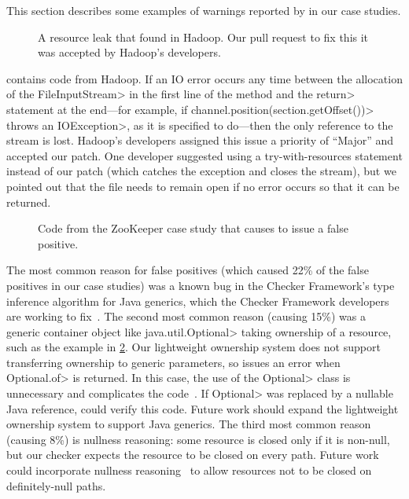 This section describes some examples of warnings reported by \tool
in our case studies.

\begin{figure}
  
  \prefigcaption
  \caption{A resource leak that \tool found in Hadoop. Our pull request
    to fix this it was accepted by Hadoop's developers.}
  \label{fig:hadoop-bug}
\end{figure}

 contains code from Hadoop. If an IO error
occurs any time between the allocation of the \<FileInputStream>
in the first line of the method and the \<return> statement
at the end---for example, if \<channel.position(section.getOffset())>
throws an \<IOException>, as it is specified to do---then the
only reference to the stream is lost. Hadoop's developers
assigned this issue a priority of ``Major'' and accepted our
patch.
One developer suggested using a try-with-resources statement instead
of our patch (which catches the exception and closes the stream),
but we pointed out that
the file needs to remain open if no error occurs so that it can be
returned.

\begin{figure}
  
  \prefigcaption
  \caption{Code from the ZooKeeper case study that causes \tool
  to issue a false positive.}
  \label{fig:zookeeper-optional}
\end{figure}

The most common reason for false
positives (which caused 22\% of the false positives in our case studies) was
a known bug in the Checker Framework’s
type inference algorithm for Java generics, which the Checker Framework
developers are working to fix~\cite{issue979}.
The second most common reason (causing 15\%)
was a generic container object like \<java.util.Optional> taking ownership of a resource, such
as the example in \cref{fig:zookeeper-optional}. Our lightweight ownership
system does not support transferring ownership to generic parameters,
so \tool issues an error when \<Optional.of> is returned. In this case, the use
of the \<Optional> class is unnecessary and complicates the
code~\cite{ErnstNothingIsBetterThanOptional}.  If \<Optional> was replaced
by a nullable Java reference,
\tool could verify this code. Future work should expand the lightweight ownership system to
support Java generics.
The third most common reason (causing 8\%) is nullness reasoning: some resource
is closed only if it is non-null, but our checker expects the resource to be
closed on every path. Future work could incorporate nullness reasoning~\cite{PapiACPE2008} to
allow resources not to be closed on definitely-null paths.

